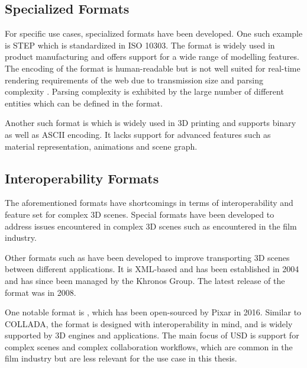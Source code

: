 \subsection*{Specialized Formats}
\label{ch:specializedFormats}

For specific use cases, specialized formats have been developed. One such example is \gls{STEP} which is standardized in ISO 10303. The format is widely used in product manufacturing and offers support for a wide range of modelling features. The  encoding of the format is human-readable but is not well suited for real-time rendering requirements of the web due to transmission size and parsing complexity \cite{marjudi2010StepIgesreview}. Parsing complexity is exhibited by the large number of different entities which can be defined in the format.

Another such format is  which is widely used in 3D printing and supports binary as well as \gls{ASCII} encoding. It lacks support for advanced features such as material representation, animations and scene graph.

\subsection*{Interoperability Formats}

The aforementioned formats have shortcomings in terms of interoperability and feature set for complex 3D scenes. Special formats have been developed to address issues encountered in complex 3D scenes such as encountered in the film industry.

Other formats such as  have been developed to improve transporting 3D scenes between different applications. It is XML-based and has been established in 2004 and has since been managed by the \gls{Khronos Group}. The latest release of the format was in 2008.

One notable format is , which has been open-sourced by Pixar in 2016. Similar to \gls{COLLADA}, the format is designed with interoperability in mind, and is widely supported by 3D engines and applications. The main focus of \gls{USD} is support for complex scenes and complex collaboration workflows, which are common in the film industry but are less relevant for the use case in this thesis.

